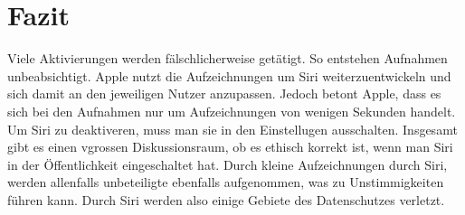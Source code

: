 \documentclass{article}
\begin{document}
\section{Fazit}
Viele Aktivierungen werden fälschlicherweise getätigt. So entstehen Aufnahmen unbeabsichtigt. Apple nutzt die Aufzeichnungen um Siri weiterzuentwickeln und sich damit an den jeweiligen Nutzer anzupassen. Jedoch betont Apple, dass es sich bei den Aufnahmen nur um Aufzeichnungen von wenigen Sekunden handelt. Um Siri zu deaktiveren, muss man sie in den Einstellugen ausschalten.
Insgesamt gibt es einen vgrossen Diskussionsraum, ob es ethisch korrekt ist, wenn man Siri in der Öffentlichkeit eingeschaltet hat. Durch kleine Aufzeichnungen durch Siri, werden allenfalls unbeteiligte ebenfalls aufgenommen, was zu Unstimmigkeiten führen kann. Durch Siri werden also einige Gebiete des Datenschutzes verletzt.


\end{document}
